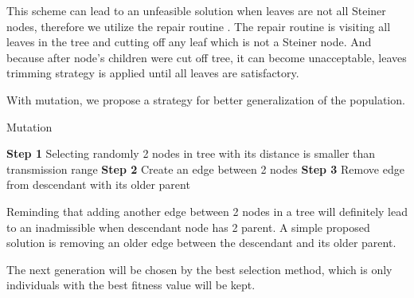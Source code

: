 	This scheme can lead to an unfeasible solution when leaves are not all Steiner nodes, therefore we utilize the repair routine \cite{lu2014construction}. The repair routine is visiting all leaves in the tree and cutting off any leaf which is not a Steiner node. And because after node’s children were cut off tree, it can become unacceptable, leaves trimming strategy is applied until all leaves are satisfactory.

	With mutation, we propose a strategy for better generalization of the population.

\begin{algorithm}
\caption{Mutation}
\begin{algorithmic}[0]
\State \textbf{Step 1} Selecting randomly 2 nodes in tree with its distance is smaller than transmission range
\State \textbf{Step 2} Create an edge between 2 nodes
\State \textbf{Step 3} Remove edge from descendant with its older parent
\end{algorithmic}
\end{algorithm}

	Reminding that adding another edge between 2 nodes in a tree will definitely lead to an inadmissible when descendant node has 2 parent. A simple proposed solution is removing an older edge between the descendant and its older parent.

\noindent{}

	The next generation will be chosen by the best selection method, which is only individuals with the best fitness value will be kept.